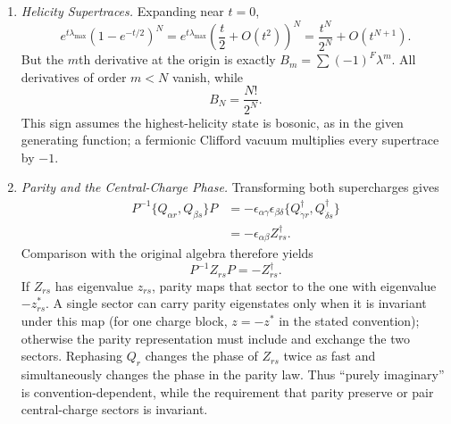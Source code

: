 \begin{enumerate}
  \begin{enumerate}
    \item \emph{Helicity Supertraces.}
    Expanding near \(t=0\),
      \[
        e^{t\lambda_{\max}}(1-e^{-t/2})^N
          =e^{t\lambda_{\max}}
           \left(\frac t2+O(t^2)\right)^N
          =\frac{t^N}{2^N}+O(t^{N+1}).
      \]
      But the \(m\)th derivative at the origin is exactly
      \(B_m=\sum(-1)^F\lambda^m\).  All derivatives of order \(m<N\) vanish,
      while
      \[
        B_N=\frac{N!}{2^N}.
      \]
      This sign assumes the highest-helicity state is bosonic, as in the given
      generating function; a fermionic Clifford vacuum multiplies every
      supertrace by \(-1\).
    \item \emph{Parity and the Central-Charge Phase.}
    Transforming both supercharges gives
      \[
      \begin{aligned}
        P^{-1}\{Q_{\alpha r},Q_{\beta s}\}P
          &=-\epsilon_{\alpha\gamma}\epsilon_{\beta\delta}
            \{Q^\dagger_{\dot\gamma r},
              Q^\dagger_{\dot\delta s}\}\\
          &=-\epsilon_{\alpha\beta}Z^\dagger_{rs}.
      \end{aligned}
      \]
      Comparison with the original algebra therefore yields
      \[
        P^{-1}Z_{rs}P=-Z^\dagger_{rs}.
      \]
      If \(Z_{rs}\) has eigenvalue \(z_{rs}\), parity maps that sector to the
      one with eigenvalue \(-z_{rs}^*\).  A single sector can carry parity
      eigenstates only when it is invariant under this map (for one charge
      block, \(z=-z^*\) in the stated convention); otherwise the parity
      representation must include and exchange the two sectors.  Rephasing
      \(Q_r\) changes the phase of \(Z_{rs}\) twice as fast and simultaneously
      changes the phase in the parity law.  Thus ``purely imaginary'' is
      convention-dependent, while the requirement that parity preserve or
      pair central-charge sectors is invariant.
  \end{enumerate}

\end{enumerate}
